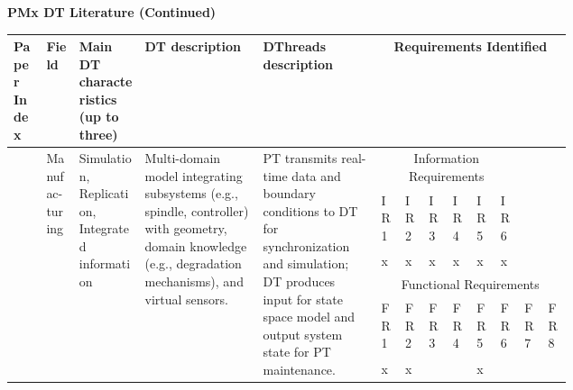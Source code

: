 \documentclass[runningheads]{llncs}
\begin{document}
\begin{landscape}
\begin{small}
\begin{longtable}
        

                \end{longtable}
        \end{small}

        \newpage
        \textbf{PMx DT Literature (Continued)}
        \vspace{2mm}
        
        \begin{small}
    \begin{longtable}{p{0.05\linewidth}p{0.05\linewidth}p{0.1\linewidth}p{0.18\linewidth}p{0.18\linewidth}p{0.02\linewidth}p{0.02\linewidth}p{0.02\linewidth}p{0.02\linewidth}p{0.02\linewidth}p{0.02\linewidth}p{0.02\linewidth}p{0.02\linewidth}}
    \bottomrule
        Paper Index & Field &  Main DT characteristics (up to three) & DT description & DThreads description & \multicolumn{8}{c}{Requirements Identified} \\\bottomrule
        
        \vspace{3mm}
        \multirow{6}{=}{\cite{luo2020hybrid}} & \multirow{6}{=}{Manufac-turing} &  \multirow{6}{=}{Simulation, Replication, Integrated information} & \multirow{6}{=}{Multi-domain model integrating subsystems (e.g., spindle, controller) with geometry, domain knowledge (e.g., degradation mechanisms), and virtual sensors.} & \multirow{6}{=}{PT transmits real-time data and boundary conditions to DT for synchronization and simulation; DT produces input for state space model and output system state for PT maintenance.} & \multicolumn{6}{c}{Information Requirements} &  \\\cmidrule{6-11}
        & & & & & IR1 & IR2 & IR3 & IR4 & IR5 & IR6 & & \\\cmidrule{6-11}
        & & & & & x & x & x & x & x & x & & \\\cmidrule{6-13}
        \vspace{3mm}
        & & & & & \multicolumn{8}{c}{Functional Requirements} \\\cmidrule{6-13}
        & & & & & FR1 & FR2 & FR3 & FR4 & FR5 & FR6 & FR7 & FR8 \\\cmidrule{6-13}
        & & & & & x & x &  &  & x & & & \\\bottomrule



\end{longtable}
\end{small}
\end{landscape}
\end{document}

